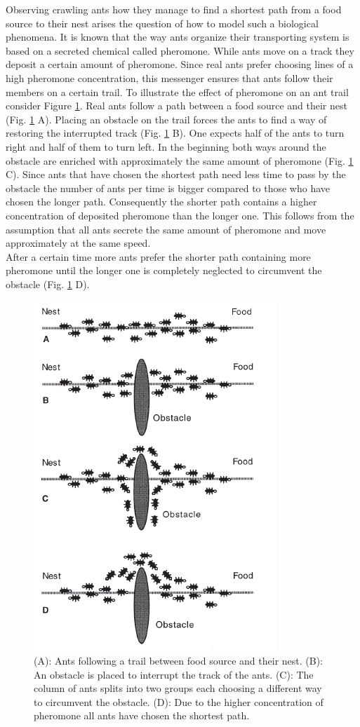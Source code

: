 
Observing crawling ants how they manage to find a shortest path from a food source to their nest arises the question of how to model such a biological phenomena. It is known that the way ants organize their transporting system is based on a secreted chemical called pheromone. While ants move on a track they deposit a certain amount of pheromone. Since real ants prefer choosing lines of a high pheromone concentration, this messenger ensures that ants follow their members on a certain trail.
To illustrate the effect of pheromone on an ant trail consider Figure \ref{fig:ants}. Real ants follow a path between a food source and their nest (Fig. \ref{fig:ants} A). Placing an obstacle on the trail forces the ants to find a way of restoring the interrupted track (Fig. \ref{fig:ants} B). One expects half of the ants to turn right and half of them to turn left. In the beginning both ways around the obstacle are enriched with approximately the same amount of pheromone (Fig. \ref{fig:ants} C). Since ants that have chosen the shortest path need less time to pass by the obstacle the number of ants per time is bigger compared to those who have chosen the longer path. Consequently the shorter path contains a higher concentration of deposited pheromone than the longer one. This follows from the assumption that all ants secrete the same amount of pheromone and move approximately at the same speed. \\
After a certain time more ants prefer the shorter path containing more pheromone until the longer one is completely neglected to circumvent the obstacle (Fig. \ref{fig:ants} D).


\begin{figure}
\includegraphics[width=0.5\linewidth]{Plots/Ants.png}
\caption{(A): Ants following a trail between food source and their nest. (B): An obstacle is placed to interrupt the track of the ants. (C): The column of ants splits into two groups each choosing a different way to circumvent the obstacle. (D): Due to the higher concentration of pheromone all ants have chosen the shortest path.}
\label{fig:ants}
\end{figure}

